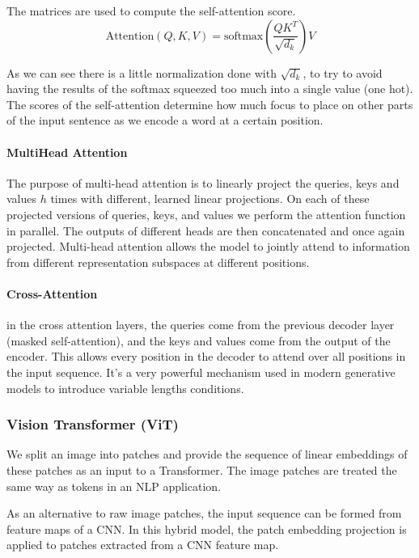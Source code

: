 The matrices are used to compute the self-attention score.
$$\text{Attention}(Q,K,V)=\text{softmax}(\frac{QK^T}{\sqrt{d_k}})V$$

As we can see there is a little normalization done with $\sqrt{d_k}$, to try to avoid having the results of the softmax squeezed too much into a single value (one hot).
The scores of the self-attention determine how much focus to place on other parts of the input sentence as we encode a word at a certain position.

\paragraph{MultiHead Attention}
The purpose of multi-head attention is to linearly project the queries, keys and values $h$ times with different, learned linear projections.
On each of these projected versions of queries, keys, and values we perform the attention function in parallel.
The outputs of different heads are then concatenated and once again projected.
Multi-head attention allows the model to jointly attend to information from different representation subspaces at different positions.


\paragraph{Cross-Attention}
in the cross attention layers, the queries come from the previous decoder layer (masked self-attention), and the keys and values come from the output of the encoder.
This allows every position in the decoder to attend over all positions in the input sequence.
It's a very powerful mechanism used in modern generative models to introduce variable lengths conditions.


\subsubsection{Vision Transformer (ViT)}
We split an image into patches and provide the sequence of linear embeddings of these patches as an input to a Transformer.
The image patches are treated the same way as tokens in an NLP application.

As an alternative to raw image patches, the input sequence can be formed from feature maps of a CNN.
In this hybrid model, the patch embedding projection is applied to patches extracted from a CNN feature map.

